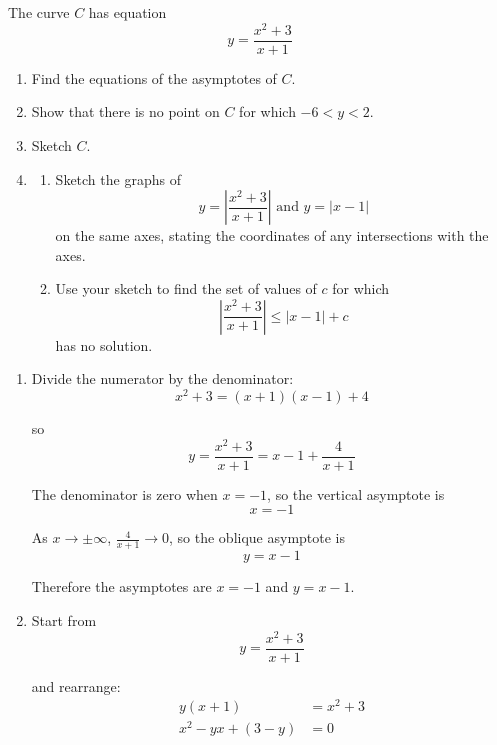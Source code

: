 \documentclass[leqno]{article}
\begin{document}
\begin{enumerate}[
  label=\textbf{\arabic*.},
  leftmargin=*,
  topsep=0pt,
  partopsep=0pt,
  parsep=0pt
]
\newpage

\questionitem

The curve $C$ has equation
\[
y=\frac{x^2+3}{x+1}
\]
\begin{enumerate}[label=\textbf{(\alph*)}]
  \item Find the equations of the asymptotes of $C$.  \\
  \item Show that there is no point on $C$ for which $-6<y<2$.  \\
  \item Sketch $C$.  \\
  \item
  \begin{enumerate}[label=(\roman*)]
    \item Sketch the graphs of
    \[
    y=\left|\frac{x^2+3}{x+1}\right| \text{ and } y=|x-1|
    \]
    on the same axes, stating the coordinates of any intersections with the axes. 
    \item Use your sketch to find the set of values of $c$ for which
    \[
    \left|\frac{x^2+3}{x+1}\right| \le |x-1|+c
    \]
    has no solution. 
  \end{enumerate}
\end{enumerate}

\vspace*{10pt}

\begin{djsSolution}
\begin{enumerate}[label=\textbf{(\alph*)}]
  \item Divide the numerator by the denominator:
  \[
  x^2+3=(x+1)(x-1)+4
  \]

  so
  \[
  y=\frac{x^2+3}{x+1}=x-1+\frac{4}{x+1}
  \]

  The denominator is zero when \(x=-1\), so the vertical asymptote is
  \[
  x=-1
  \]

  As \(x\to\pm\infty\), \(\frac{4}{x+1}\to 0\), so the oblique asymptote is
  \[
  y=x-1
  \]

  Therefore the asymptotes are $x=-1$ and $y=x-1$.

  \item Start from
  \[
  y=\frac{x^2+3}{x+1}
  \]

  and rearrange:
  \begin{align*}
  y(x+1)&=x^2+3\\
  x^2-yx+(3-y)&=0
  \end{align*}


\end{enumerate}
\end{djsSolution}
\end{enumerate}
\end{document}
